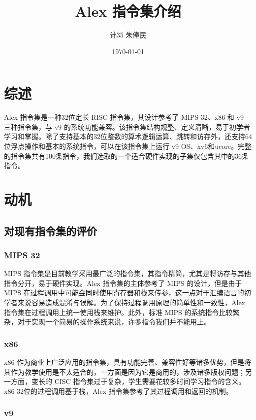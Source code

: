 \documentclass[11pt, a4paper]{article}
\title{\hei Alex 指令集介绍}
\author{\kai \quad 计35 \quad 朱俸民 \quad 2012011894}
\date{\kai \today}
\begin{document}
\maketitle

\section{综述}

Alex 指令集是一种32位定长 RISC 指令集，其设计参考了 MIPS 32、x86 和 v9 三种指令集，与 v9 的系统功能兼容。该指令集结构规整、定义清晰，易于初学者学习和掌握。除了支持基本的32位整数的算术逻辑运算、跳转和访存外，还支持64位浮点操作和基本的系统指令，可以在该指令集上运行 v9 OS、xv6和ucore。完整的指令集共有100条指令，我们选取的一个适合硬件实现的子集仅包含其中的36条指令。

\section{动机}

\subsection{对现有指令集的评价}

\subsubsection{MIPS 32}

MIPS 指令集是目前教学采用最广泛的指令集，其指令精简，尤其是将访存与其他指令分开，易于硬件实现。Alex 指令集的主体参考了 MIPS 的设计，但是由于 MIPS 在过程调用中可能会同时使用寄存器和栈来传参，这一点对于汇编语言的初学者来说容易造成混淆与误解。为了保持过程调用原理的简单性和一致性，Alex 指令集在过程调用上统一使用栈来维护。此外，标准 MIPS 的系统指令比较繁杂，对于实现一个简易的操作系统来说，许多指令我们并不能用上。

\subsubsection{x86}

x86 作为商业上广泛应用的指令集，具有功能完善、兼容性好等诸多优势，但是将其作为教学使用是不太适合的，一方面是因为它是商用的，涉及诸多版权问题；另一方面，变长的 CISC 指令集过于复杂，学生需要花较多时间学习指令的含义。x86 32位的过程调用基于栈，Alex 指令集参考了其过程调用和返回的机制。

\subsubsection{v9}
\end{document}
